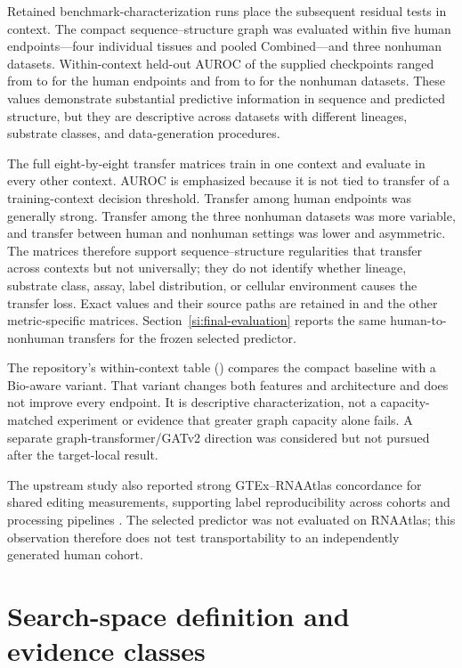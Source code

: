 \documentclass[9pt,twoside]{pnas-new}
\begin{document}
Retained benchmark-characterization runs place the subsequent residual tests in context. The compact sequence--structure graph was evaluated within five human endpoints---four individual tissues and pooled Combined---and three nonhuman datasets. Within-context held-out AUROC of the supplied checkpoints ranged from \ReferenceHumanWithinAUROCMin{} to \ReferenceHumanWithinAUROCMax{} for the human endpoints and from \ReferenceNonhumanWithinAUROCMin{} to \ReferenceNonhumanWithinAUROCMax{} for the nonhuman datasets. These values demonstrate substantial predictive information in sequence and predicted structure, but they are descriptive across datasets with different lineages, substrate classes, and data-generation procedures.

The full eight-by-eight transfer matrices train in one context and evaluate in every other context. AUROC is emphasized because it is not tied to transfer of a training-context decision threshold. Transfer among human endpoints was generally strong. Transfer among the three nonhuman datasets was more variable, and transfer between human and nonhuman settings was lower and asymmetric. The matrices therefore support sequence--structure regularities that transfer across contexts but not universally; they do not identify whether lineage, substrate class, assay, label distribution, or cellular environment causes the transfer loss. Exact values and their source paths are retained in  and the other metric-specific matrices. Section~\ref{si:final-evaluation} reports the same human-to-nonhuman transfers for the frozen selected predictor.

The repository's within-context table () compares the compact baseline with a Bio-aware variant. That variant changes both features and architecture and does not improve every endpoint. It is descriptive characterization, not a capacity-matched experiment or evidence that greater graph capacity alone fails. A separate graph-transformer/GATv2 direction was considered but not pursued after the target-local result.

The upstream study also reported strong GTEx--RNAAtlas concordance for shared editing measurements, supporting label reproducibility across cohorts and processing pipelines \cite{Rosenwasser2026AdarEdit}. The selected predictor was not evaluated on RNAAtlas; this observation therefore does not test transportability to an independently generated human cohort.

\section{Search-space definition and evidence classes}\label{si:search-space}
\end{document}
